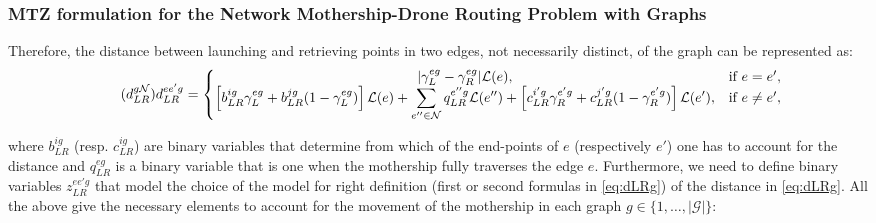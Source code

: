 
\subsubsection{MTZ formulation for the Network Mothership-Drone Routing Problem with Graphs}


Therefore, the distance between launching and retrieving points in two edges, not necessarily distinct,  of the graph can be represented as:
\begin{equation}\tag{$d^{g\mathcal N}_{LR}$}\label{eq:dLRg}
d_{LR}^{ee'g} = \left\{\begin{matrix}
|\gamma_{L}^{eg} - \gamma_{R}^{eg}|\mathcal L(e), & \text{if } e = e',\\ 
\left[b_{LR}^{ig}\gamma_{L}^{eg} + b_{LR}^{jg}(1 - \gamma_{L}^{eg})\right]\mathcal L(e) + \displaystyle \sum_{e''\in \mathcal N}q_{LR}^{e''g}\mathcal L(e'') + \left[c_{LR}^{i'g}\gamma_{R}^{e'g} + c_{LR}^{j'g}(1 - \gamma_{R}^{e'g})\right]\mathcal{L}(e'), & \text{if } e \neq e',
\end{matrix}\right.
\end{equation}

\noindent 
where $b_{LR}^{ig}$ (resp. $c_{LR}^{ig}$) are binary variables that determine from which of the end-points of $e$ (respectively $e'$) one has to account for the distance and $q_{LR}^{eg}$ is a binary variable that is one when the mothership fully traverses the edge $e$. Furthermore, we need to define binary variables $z_{LR}^{ee'g}$ that model the choice of the model for right definition (first or second formulas in \eqref{eq:dLRg}) of the distance in \eqref{eq:dLRg}. All the above give the necessary elements to account for the movement of the mothership in each graph $g\in \{1, \ldots, |\mathcal G|\}$:

